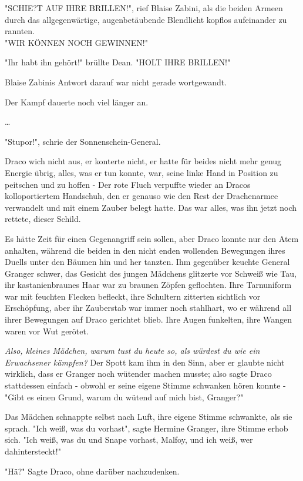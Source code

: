 {"SCHIE?T AUF IHRE BRILLEN!", rief Blaise Zabini, als die beiden Armeen durch das allgegenwärtige, augenbetäubende Blendlicht kopflos aufeinander zu rannten.\\ "WIR KÖNNEN NOCH GEWINNEN!"

"Ihr habt ihn gehört!" brüllte Dean. "HOLT IHRE BRILLEN!"

Blaise Zabinis Antwort darauf war nicht gerade wortgewandt.

Der Kampf dauerte noch viel länger an.

…

"Stupor!", schrie der Sonnenschein-General.

Draco wich nicht aus, er konterte nicht, er hatte für beides nicht mehr genug Energie übrig, alles, was er tun konnte, war, seine linke Hand in Position zu peitschen und zu hoffen - Der rote Fluch verpuffte wieder an Dracos kolloportiertem Handschuh, den er genauso wie den Rest der Drachenarmee verwandelt und mit einem Zauber belegt hatte. Das war alles, was ihn jetzt noch rettete, dieser Schild.

Es hätte Zeit für einen Gegenangriff sein sollen, aber Draco konnte nur den Atem anhalten, während die beiden in den nicht enden wollenden Bewegungen ihres Duells unter den Bäumen hin und her tanzten. Ihm gegenüber keuchte General Granger schwer, das Gesicht des jungen Mädchens glitzerte vor Schweiß wie Tau, ihr kastanienbraunes Haar war zu braunen Zöpfen geflochten. Ihre Tarnuniform war mit feuchten Flecken befleckt, ihre Schultern zitterten sichtlich vor Erschöpfung, aber ihr Zauberstab war immer noch stahlhart, wo er während all ihrer Bewegungen auf Draco gerichtet blieb. Ihre Augen funkelten, ihre Wangen waren vor Wut gerötet.

\emph{Also, kleines Mädchen, warum tust du heute so, als würdest du wie ein Erwachsener kämpfen?} Der Spott kam ihm in den Sinn, aber er glaubte nicht wirklich, dass er Granger noch wütender machen musste; also sagte Draco stattdessen einfach - obwohl er seine eigene Stimme schwanken hören konnte -\\ "Gibt es einen Grund, warum du wütend auf mich bist, Granger?"

Das Mädchen schnappte selbst nach Luft, ihre eigene Stimme schwankte, als sie sprach. "Ich weiß, was du vorhast", sagte Hermine Granger, ihre Stimme erhob sich. "Ich weiß, was du und Snape vorhast, Malfoy, und ich weiß, wer dahintersteckt!"

"Hä?" Sagte Draco, ohne darüber nachzudenken.

}
